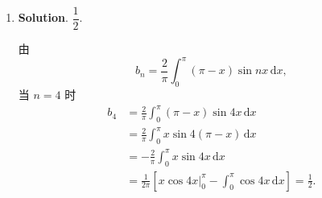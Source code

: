 \documentclass[../main.tex]{subfiles}
\begin{document}
\begin{enumerate}
          \[
              u=x\mathrm{e}^yz^3,\quad u_x=\mathrm{e}^yz^3,\quad u_y=x\mathrm{e}^yz^3,\quad u_z=3x\mathrm{e}^yz^2.
          \]
          在 \((1,1,1)\) 处有 \(u_x=u_y=\mathrm{e},\ u_z=3\mathrm{e}\)，故
          \[
              \mathrm{d}u=\mathrm{e}\,\mathrm{d}x+\mathrm{e}\,\mathrm{d}y+3\mathrm{e}\,\mathrm{d}z.
          \]

    \item \textbf{Solution}. $\dfrac12$.

          由
          \[
              b_n=\frac{2}{\pi}\int_0^\pi(\pi-x)\sin nx\,\mathrm{d}x,
          \]
          当 \(n=4\) 时
          \[
              \begin{aligned}
                  b_4 & = \frac{2}{\pi}\int_0^\pi(\pi-x)\sin 4x\,\mathrm{d}x                                         \\
                      & = \frac{2}{\pi}\int_{0}^{\pi}x\sin 4(\pi-x)\,\mathrm{d}x                                     \\
                      & = -\frac{2}{\pi}\int_{0}^{\pi}x\sin 4x\,\mathrm{d}x                                          \\
                      & = \frac{1}{2\pi}\left[x\cos 4x\Big|_0^\pi-\int_0^\pi\cos 4x\,\mathrm{d}x\right]=\frac{1}{2}. \\
              \end{aligned}
          \]

\end{enumerate}
\end{document}
